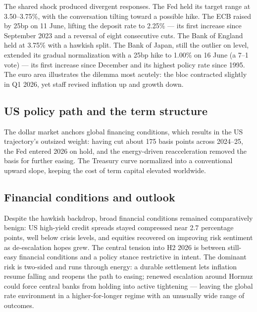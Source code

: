 \documentclass[11pt,a4paper]{article}
\begin{document}
The shared shock produced divergent responses. The Fed held its target range at 3.50--3.75\%, with the conversation tilting toward a possible hike. The ECB raised by 25bp on 11 June, lifting the deposit rate to 2.25\% --- its first increase since September 2023 and a reversal of eight consecutive cuts. The Bank of England held at 3.75\% with a hawkish split. The Bank of Japan, still the outlier on level, extended its gradual normalization with a 25bp hike to 1.00\% on 16 June (a 7--1 vote) --- its first increase since December and its highest policy rate since 1995. The euro area illustrates the dilemma most acutely: the bloc contracted slightly in Q1 2026, yet staff revised inflation up and growth down.


\subsection{US policy path and the term structure}

The dollar market anchors global financing conditions, which results in the US trajectory's outsized weight: having cut about 175 basis points across 2024--25, the Fed entered 2026 on hold, and the energy-driven reacceleration removed the basis for further easing. The Treasury curve normalized into a conventional upward slope, keeping the cost of term capital elevated worldwide.


\subsection{Financial conditions and outlook}

Despite the hawkish backdrop, broad financial conditions remained comparatively benign: US high-yield credit spreads stayed compressed near 2.7 percentage points, well below crisis levels, and equities recovered on improving risk sentiment as de-escalation hopes grew. The central tension into H2 2026 is between still-easy financial conditions and a policy stance restrictive in intent. The dominant risk is two-sided and runs through energy: a durable settlement lets inflation resume falling and reopens the path to easing; renewed escalation around Hormuz could force central banks from holding into active tightening --- leaving the global rate environment in a higher-for-longer regime with an unusually wide range of outcomes.
\end{document}
